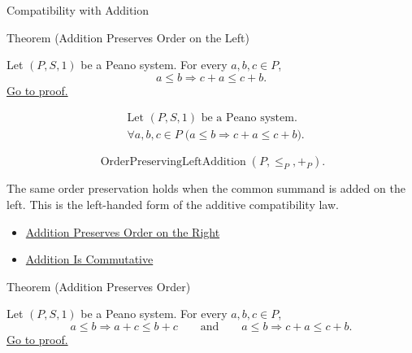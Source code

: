 \begin{topicbox}{Compatibility with Addition}
\begin{theorembox}{Theorem (Addition Preserves Order on the Left)}
\begin{theorem}
\label{thm:addition-preserves-order-on-left}
Let $(P,S,1)$ be a Peano system. For every $a,b,c \in P$,
\[
a \le b
\Longrightarrow
c+a \le c+b.
\]
\hyperref[prf:addition-preserves-order-on-left]{Go to proof.}
\end{theorem}
\end{theorembox}

\begin{remark*}
\[
\begin{aligned}
&\text{Let } (P,S,1) \text{ be a Peano system.}\\
&\forall a,b,c \in P\;
\bigl(a \le b \Longrightarrow c+a \le c+b\bigr).
\end{aligned}
\]
\end{remark*}

\begin{remark*}
\[
\operatorname{OrderPreservingLeftAddition}(P,\leq_P,+_P).
\]
\end{remark*}

\begin{remark*}[Interpretation]
The same order preservation holds when the common summand is added on the
left. This is the left-handed form of the additive compatibility law.
\end{remark*}

\begin{dependencies}
\begin{itemize}
  \item \hyperref[thm:addition-preserves-order-on-right]{Addition Preserves Order on the Right}
  \item \hyperref[thm:addition-commutative]{Addition Is Commutative}
\end{itemize}
\end{dependencies}

\begin{theorembox}{Theorem (Addition Preserves Order)}
\begin{theorem}
\label{thm:addition-preserves-order}
Let $(P,S,1)$ be a Peano system. For every $a,b,c \in P$,
\[
a \le b \Longrightarrow a+c \le b+c
\qquad\text{and}\qquad
a \le b \Longrightarrow c+a \le c+b.
\]
\hyperref[prf:addition-preserves-order]{Go to proof.}
\end{theorem}
\end{theorembox}


\end{topicbox}
